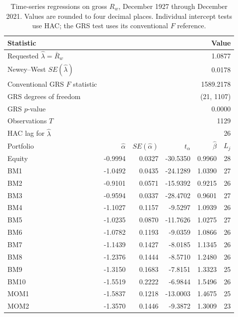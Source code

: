 \begin{table}[!htbp]
  \centering
  \small
  \caption{Time-series regressions on gross $R_w$,
  December 1927 through December 2021.
  Values are rounded to four decimal places. Individual intercept tests use HAC;
  the GRS test uses its conventional $F$ reference.}
  \label{tab:q4d-regression-results}
  \begin{tabular}{lrrrrr}
    \toprule
    Statistic & \multicolumn{5}{r}{Value} \\
    \midrule
    Requested $\hat\lambda=\bar R_w$ & \multicolumn{5}{r}{1.0877} \\
    Newey--West $SE(\hat\lambda)$ & \multicolumn{5}{r}{0.0178} \\
    Conventional GRS $F$ statistic & \multicolumn{5}{r}{1589.2178} \\
    GRS degrees of freedom & \multicolumn{5}{r}{(21, 1107)} \\
    GRS $p$-value & \multicolumn{5}{r}{0.0000} \\
    Observations $T$ & \multicolumn{5}{r}{1129} \\
    HAC lag for $\hat\lambda$ & \multicolumn{5}{r}{26} \\
    \midrule
    Portfolio & $\hat\alpha$ & $SE(\hat\alpha)$ & $t_\alpha$ & $\hat\beta$ & $L_j$ \\
    \midrule
    Equity & -0.9994 & 0.0327 & -30.5350 & 0.9960 & 28 \\
    \addlinespace
    BM1 & -1.0492 & 0.0435 & -24.1289 & 1.0390 & 27 \\
    BM2 & -0.9101 & 0.0571 & -15.9392 & 0.9215 & 26 \\
    BM3 & -0.9594 & 0.0337 & -28.4702 & 0.9601 & 27 \\
    BM4 & -1.1027 & 0.1157 & -9.5297 & 1.0939 & 26 \\
    BM5 & -1.0235 & 0.0870 & -11.7626 & 1.0275 & 27 \\
    BM6 & -1.0782 & 0.1193 & -9.0359 & 1.0866 & 26 \\
    BM7 & -1.1439 & 0.1427 & -8.0185 & 1.1345 & 26 \\
    BM8 & -1.2376 & 0.1444 & -8.5710 & 1.2480 & 26 \\
    BM9 & -1.3150 & 0.1683 & -7.8151 & 1.3323 & 25 \\
    BM10 & -1.5519 & 0.2222 & -6.9844 & 1.5496 & 26 \\
    \addlinespace
    MOM1 & -1.5837 & 0.1218 & -13.0003 & 1.4675 & 25 \\
    MOM2 & -1.3570 & 0.1446 & -9.3872 & 1.3009 & 23 \\

\end{tabular}
\end{table}
